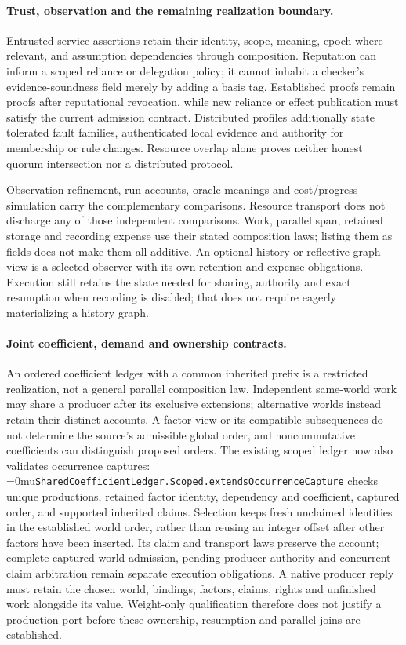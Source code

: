 \documentclass[11pt]{article}
\newcommand{\leanname}[1]{\textup{\Urlmuskip=0mu\relax\nolinkurl{#1}}}
\theoremstyle{definition}
\theoremstyle{remark}
\begin{document}
\paragraph{Trust, observation and the remaining realization boundary.}
Entrusted service assertions retain their identity, scope, meaning, epoch
where relevant, and assumption dependencies through composition. Reputation
can inform a scoped reliance or delegation policy; it cannot inhabit a
checker's evidence-soundness field merely by adding a basis tag. Established
proofs remain proofs after reputational revocation, while new reliance or
effect publication must satisfy the current admission contract.
Distributed profiles additionally state tolerated fault families,
authenticated local evidence and authority for membership or rule changes.
Resource overlap alone proves neither honest quorum intersection nor a
distributed protocol.

Observation refinement, run accounts, oracle meanings and cost/progress
simulation carry the complementary comparisons.
Resource transport does not discharge any of those independent comparisons.
Work, parallel span, retained storage and recording expense use their stated
composition laws; listing them as fields does not make them all additive.
An optional history or reflective graph view is a selected observer with its
own retention and expense obligations. Execution still retains the state
needed for sharing, authority and exact resumption when recording is disabled;
that does not require eagerly materializing a history graph.

\paragraph{Joint coefficient, demand and ownership contracts.}
An ordered coefficient ledger with a common inherited prefix is a restricted
realization, not a general parallel composition law. Independent same-world
work may share a producer after its exclusive extensions; alternative worlds
instead retain their distinct accounts. A factor view or its compatible
subsequences do not determine the source's admissible global order, and
noncommutative coefficients can distinguish proposed orders.
The existing scoped ledger now also validates occurrence captures:
\leanname{SharedCoefficientLedger.Scoped.extendsOccurrenceCapture} checks
unique productions, retained factor identity, dependency and coefficient,
captured order, and supported inherited claims. Selection keeps fresh unclaimed
identities in the established world order, rather than reusing an integer
offset after other factors have been inserted.
Its claim and transport laws preserve the account; complete captured-world
admission, pending producer authority and concurrent claim arbitration remain
separate execution obligations. A native producer reply must retain the
chosen world, bindings, factors, claims, rights and unfinished work alongside
its value. Weight-only qualification therefore does not justify a production
port before these ownership, resumption and parallel joins are established.
\end{document}

